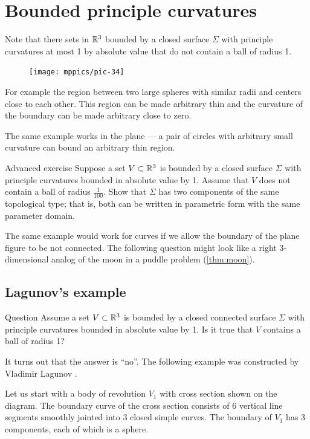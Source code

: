 \chapter{Bounded principle curvatures}

Note that there sets in $\mathbb{R}^3$ bounded by a closed surface $\Sigma$ with principle curvatures at most 1 by absolute value
that do not contain a ball of radius 1.

\begin{figure}
\vskip-4mm
\centering
\texttt{[image: mppics/pic-34]}
\vskip0mm
\end{figure}

For example the region between two large spheres with similar radii and centers close to each other. 
This region can be made arbitrary thin and the curvature of the boundary can be made arbitrary close to zero.

The same example works in the plane --- a pair of circles with arbitrary small curvature can bound an arbitrary thin region.

\begin{thm}{Advanced exercise}
Suppose a set $V\subset \mathbb{R}^3$ is bounded by a closed surface $\Sigma$ with principle curvatures bounded in absolute value by 1.
Assume that $V$ does not contain a ball of radius $\tfrac1{100}$.
Show that $\Sigma$ has two components of the same topological type; 
that is, both can be written in parametric form with the same parameter domain. 
\end{thm}


The same example would work for curves if we allow the boundary of the plane figure to be not connected.
The following question might look like a right 3-dimensional analog of the moon in a puddle problem (\ref{thm:moon}).

\section{Lagunov's example}

\begin{thm}{Question}
Assume a set $V\subset \mathbb{R}^3$ is bounded by a closed connected surface $\Sigma$ with 
principle curvatures bounded in absolute value by 1.
Is it true that $V$ contains a ball of radius 1?
\end{thm}

It turns out that the answer is  ``no''. The following example was constructed by Vladimir Lagunov \cite{lagunov}.


Let us start with a body of revolution $V_1$ with cross section shown on the diagram.
The boundary curve of the cross section consists of 6 vertical line segments smoothly jointed into 3 closed simple curves. 
The boundary of $V_1$ has 3 components, each of which is a sphere.

